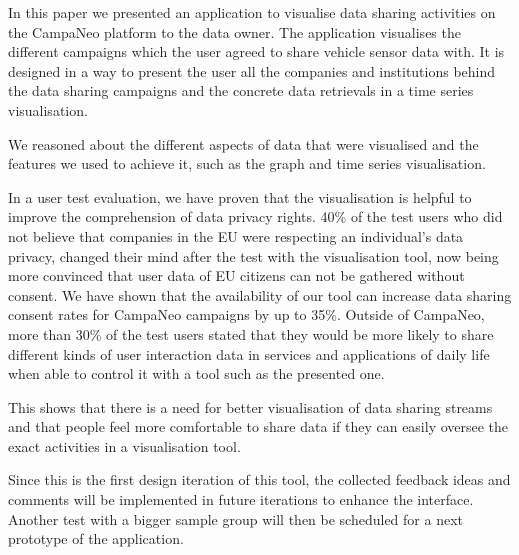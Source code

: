 \documentclass[../paper.tex]{subfiles}
\begin{document}
  In this paper we presented an application to visualise data sharing activities on the CampaNeo platform to the data owner.
  The application visualises the different campaigns which the user agreed to share vehicle sensor data with.
  It is designed in a way to present the user all the companies and institutions behind the data sharing campaigns and the concrete data retrievals in a time series visualisation.
  
  We reasoned about the different aspects of data that were visualised and the features we used to achieve it, such as the graph and time series visualisation.
  
  In a user test evaluation, we have proven that the visualisation is helpful to improve the comprehension of data privacy rights.
  40\% of the test users who did not believe that companies in the EU were respecting an individual's data privacy, changed their mind after the test with the visualisation tool, now being more convinced that user data of EU citizens can not be gathered without consent. 
  We have shown that the availability of our tool can increase data sharing consent rates for CampaNeo campaigns by up to 35\%.
  Outside of CampaNeo, more than 30\% of the test users stated that they would be more likely to share different kinds of user interaction data in services and applications of daily life when able to control it with a tool such as the presented one. 
  
  This shows that there is a need for better visualisation of data sharing streams and that people feel more comfortable to share data if they can easily oversee the exact activities in a visualisation tool. 
  
  Since this is the first design iteration of this tool, the collected feedback ideas and comments will be implemented in future iterations to enhance the interface. Another test with a bigger sample group will then be scheduled for a next prototype of the application. 
   
\end{document}
